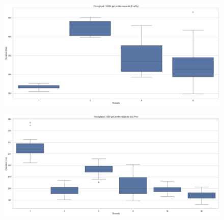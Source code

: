 \documentclass[a4paper]{article}
\begin{document}
\begin{figure}[H]
	\centering
	\includegraphics[width = \linewidth]{Images/ThroughputBoxFirefly.png}
	\caption{}
\end{figure}
\begin{figure}[H]
	\centering
	\includegraphics[width = \linewidth]{Images/ThroughputBox.png}
	\caption{}
\end{figure}
\end{document}
